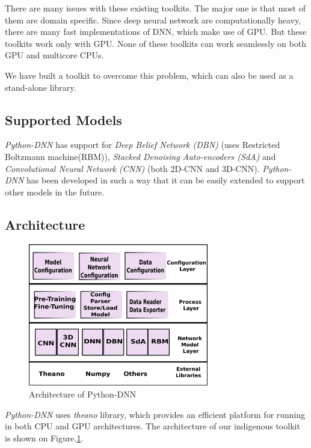 There are many issues with these existing toolkits.  The major one is that most of them are domain specific.  Since deep neural network are computationally heavy, there are many fast implementations of DNN, which make use of GPU.  But these toolkits work only with GPU.  None of these toolkits can work seamlessly on both GPU and multicore CPUs. 

We have built a toolkit to overcome this problem, which can also be used as a stand-alone library.


\subsection{Supported Models}
\label{sec:python-dnnModels}
\textit{Python-DNN}  has support  for \textit{Deep Belief Network (DBN)} \cite{hinton2002training} (uses Restricted Boltzmann machine(RBM)), \textit{Stacked Denoising Auto-encoders (SdA)} \cite{vincent2010stacked} and \textit{Convolutional Neural Network (CNN)} \cite{lecun1998gradient} (both 2D-CNN and 3D-CNN). \textit{Python-DNN} has been developed in such a way that it can be easily extended to support other models in the future.

\subsection{Architecture}

\begin{figure}[ht]
\centering
\includegraphics[width=0.7\textwidth]{./imgs/Python-DNNArch.eps}
\caption{Architecture of Python-DNN}
\label{fig:pydnn-arch}
\end{figure}

\textit{Python-DNN} uses \emph{theano} library, which provides an efficient platform for running in both CPU and GPU architectures.  The architecture of our indigenous toolkit is shown on Figure.\ref{fig:pydnn-arch}. 

